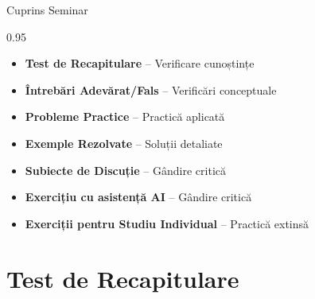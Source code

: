 \documentclass[9pt, aspectratio=169, t]{beamer}
\subtitle{Seminar 9: Prophet și TBATS}
\begin{document}
{
\begin{frame}
    \titlepage
\end{frame}
}

\begin{frame}{Cuprins Seminar}
    \begin{cminipage}{0.95\textwidth}
    \begin{itemize}\setlength{\itemsep}{0pt}
        \item \textbf{Test de Recapitulare} -- Verificare cunoștințe
        \vspace{0.15cm}
        \item \textbf{Întrebări Adevărat/Fals} -- Verificări conceptuale
        \vspace{0.15cm}
        \item \textbf{Probleme Practice} -- Practică aplicată
        \vspace{0.15cm}
        \item \textbf{Exemple Rezolvate} -- Soluții detaliate
        \vspace{0.15cm}
        \item \textbf{Subiecte de Discuție} -- Gândire critică
        \vspace{0.15cm}
        \item \textbf{Exercițiu cu asistență AI} -- Gândire critică
        \vspace{0.15cm}
        \item \textbf{Exerciții pentru Studiu Individual} -- Practică extinsă
    \end{itemize}
    \end{cminipage}
\end{frame}


\section{Test de Recapitulare}
\end{document}
